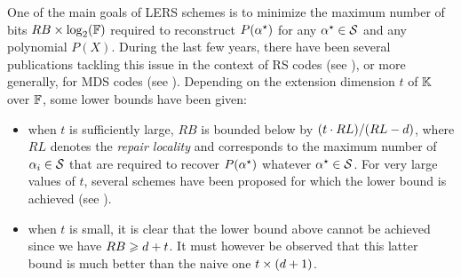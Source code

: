 \documentclass{llncs}
\begin{document}
One of the main goals of LERS schemes is to minimize the maximum number of bits $RB\times \log_2(\mathbb{F})$ required to reconstruct $P(\alpha^{\star})$ for any $\alpha^{\star}\in \mathcal{S}$ and any polynomial $P(X)$. During the last few years, there have been several publications tackling this issue in the context of RS codes (see \eg \cite{DRWS11,SPDC13}), or more generally, for MDS codes (see \eg \cite{CHJL11,DGWWR10,SR10}). Depending on the extension dimension $t$ of $\mathbb{K}$ over $\mathbb{F}$, some lower bounds have been given:
\begin{itemize}
\item when $t$ is sufficiently large, $RB$ is bounded below by $(t\cdot RL)/(RL-d)$, where $RL$ denotes the {\em repair locality} and corresponds to the maximum number of $\alpha_{i} \in \mathcal{S}$ that are required to recover $P(\alpha^{\star})$ whatever $\alpha^{\star} \in \mathcal{S}$. For very large values of $t$, several schemes have been proposed for which the lower bound is achieved (see \eg \cite{CHJL11,SR10}).
\item when $t$ is small, it is clear that the lower bound above cannot be achieved since we have $RB \geqslant d + t$. It must however be observed that this latter bound is much better than the naive one $t\times (d + 1)$. 
\end{itemize}
\end{document}
